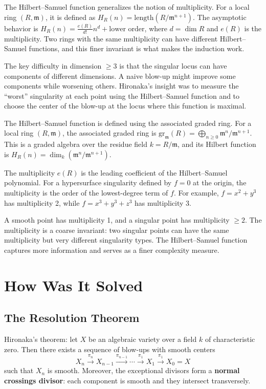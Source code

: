 The Hilbert--Samuel function generalizes the notion of multiplicity. For a local ring $(R, \mathfrak{m})$, it is defined as $H_R(n) = \text{length}(R/\mathfrak{m}^{n+1})$. The asymptotic behavior is $H_R(n) = \frac{e(R)}{d!}n^d + \text{lower order}$, where $d = \dim R$ and $e(R)$ is the multiplicity. Two rings with the same multiplicity can have different Hilbert--Samuel functions, and this finer invariant is what makes the induction work.

The key difficulty in dimension $\geq 3$ is that the singular locus can have components of different dimensions. A naive blow-up might improve some components while worsening others. Hironaka's insight was to measure the ``worst'' singularity at each point using the Hilbert--Samuel function and to choose the center of the blow-up at the locus where this function is maximal.

The Hilbert--Samuel function is defined using the associated graded ring. For a local ring $(R, \mathfrak{m})$, the associated graded ring is $\text{gr}_{\mathfrak{m}}(R) = \bigoplus_{n \geq 0} \mathfrak{m}^n / \mathfrak{m}^{n+1}$. This is a graded algebra over the residue field $k = R/\mathfrak{m}$, and its Hilbert function is $H_R(n) = \dim_k(\mathfrak{m}^n / \mathfrak{m}^{n+1})$.

The multiplicity $e(R)$ is the leading coefficient of the Hilbert--Samuel polynomial. For a hypersurface singularity defined by $f = 0$ at the origin, the multiplicity is the order of the lowest-degree term of $f$. For example, $f = x^2 + y^3$ has multiplicity 2, while $f = x^3 + y^3 + z^3$ has multiplicity 3.

A smooth point has multiplicity 1, and a singular point has multiplicity $\geq 2$. The multiplicity is a coarse invariant: two singular points can have the same multiplicity but very different singularity types. The Hilbert--Samuel function captures more information and serves as a finer complexity measure.

\section{How Was It Solved}

\subsection*{The Resolution Theorem}

Hironaka's theorem: let $X$ be an algebraic variety over a field $k$ of characteristic zero. Then there exists a sequence of blow-ups with smooth centers
\[
X_n \xrightarrow{\pi_n} X_{n-1} \xrightarrow{\pi_{n-1}} \cdots \xrightarrow{\pi_1} X_1 \xrightarrow{\pi_1} X_0 = X
\]
such that $X_n$ is smooth. Moreover, the exceptional divisors form a \textbf{normal crossings divisor}: each component is smooth and they intersect transversely.

